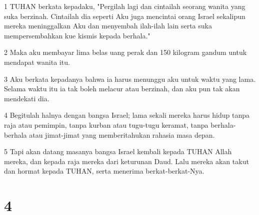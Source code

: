 \par 1 TUHAN berkata kepadaku, "Pergilah lagi dan cintailah seorang wanita yang suka berzinah. Cintailah dia seperti Aku juga mencintai orang Israel sekalipun mereka meninggalkan Aku dan menyembah ilah-ilah lain serta suka mempersembahkan kue kismis kepada berhala."
\par 2 Maka aku membayar lima belas uang perak dan 150 kilogram gandum untuk mendapat wanita itu.
\par 3 Aku berkata kepadanya bahwa ia harus menunggu aku untuk waktu yang lama. Selama waktu itu ia tak boleh melacur atau berzinah, dan aku pun tak akan mendekati dia.
\par 4 Begitulah halnya dengan bangsa Israel; lama sekali mereka harus hidup tanpa raja atau pemimpin, tanpa kurban atau tugu-tugu keramat, tanpa berhala-berhala atau jimat-jimat yang memberitahukan rahasia masa depan.
\par 5 Tapi akan datang masanya bangsa Israel kembali kepada TUHAN Allah mereka, dan kepada raja mereka dari keturunan Daud. Lalu mereka akan takut dan hormat kepada TUHAN, serta menerima berkat-berkat-Nya.

\chapter{4}

